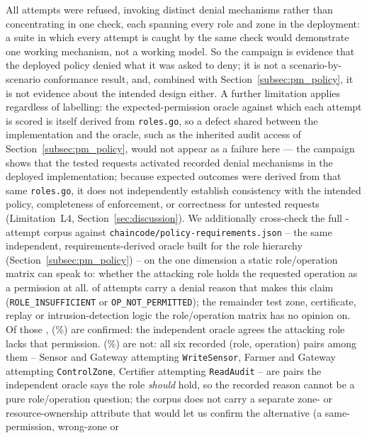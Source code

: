\documentclass[a4paper,fleqn]{cas-sc}
\begin{document}
All \SecAttempts{} attempts were refused, invoking \SecDistinctReasons{}
distinct denial mechanisms rather than concentrating in one check, each
spanning every role and zone in the deployment: a suite in which every
attempt is caught by the same check would demonstrate one working
mechanism, not a working model. So the campaign is evidence that the
deployed policy denied what it was asked to deny; it is not a
scenario-by-scenario conformance result, and, combined with
Section~\ref{subsec:pm_policy}, it is not evidence about the intended
design either. A further limitation applies regardless of labelling: the
expected-permission oracle against which each attempt is scored is itself
derived from \texttt{roles.go}, so a defect shared between the
implementation and the oracle, such as the inherited audit access of
Section~\ref{subsec:pm_policy}, would not appear as a failure here — the
campaign shows that the tested requests activated \SecDistinctReasons{}
recorded denial mechanisms in the deployed implementation; because
expected outcomes were derived from that same \texttt{roles.go}, it does
not independently establish consistency with the intended policy,
completeness of enforcement, or correctness for untested requests
(Limitation~L4, Section~\ref{sec:discussion}). We additionally cross-check
the full \SecAttempts{}-attempt corpus against
\texttt{chaincode/policy-requirements.json} -- the same independent,
requirements-derived oracle built for the role hierarchy
(Section~\ref{subsec:pm_policy}) -- on the one dimension a static
role/operation matrix can speak to: whether the attacking role holds the
requested operation as a permission at all. \SecOracleInScope{} of
\SecAttempts{} attempts carry a denial reason that makes this claim
(\texttt{ROLE\_INSUFFICIENT} or \texttt{OP\_NOT\_PERMITTED}); the
remainder test zone, certificate, replay or intrusion-detection logic the
role/operation matrix has no opinion on. Of those \SecOracleInScope{},
\SecOracleConsistent{} (\SecOracleConsistentPct\%) are confirmed: the
independent oracle agrees the attacking role lacks that permission.
\SecOracleDiscrepant{} (\SecOracleDiscrepantPct\%) are not: all six
recorded (role, operation) pairs among them -- Sensor and Gateway
attempting \texttt{WriteSensor}, Farmer and Gateway attempting
\texttt{ControlZone}, Certifier attempting \texttt{ReadAudit} -- are
pairs the independent oracle says the role \emph{should} hold, so the
recorded reason cannot be a pure role/operation question; the corpus does
not carry a separate zone- or resource-ownership attribute that would let
us confirm the alternative (a same-permission, wrong-zone or
\end{document}
